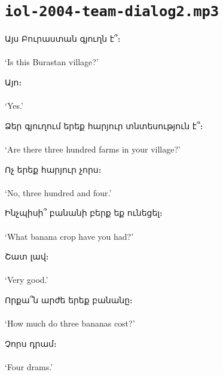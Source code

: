 \documentclass[14pt]{extarticle}
\begin{document}
\section*{\texttt{iol-2004-team-dialog2.mp3}}

\begin{exe}
\ex
\gll Այս Բուրաստան գյուղն է՞։\\
[ɑjs buɾɑstɑn ɡjuʁn ɛ]\\
\glt `Is this Burastan village?'

\ex
\gll Այո։\\
[ɑjɔ]\\
\glt `Yes.'

\ex
\gll Ձեր գյուղում երեք հարյուր տնտեսություն է՞։\\
[d͡zɛɾ ɡjuʁum jɛɾɛkʰ hɑɾjuɾ təntɛsutʰjun ɛ]\\
\glt `Are there three hundred farms in your village?'

\ex
\gll Ոչ երեք հարյուր չորս։\\
[vɔt͡ʃʰ jɛɾɛkʰ hɑɾjuɾ t͡ʃʰɔɾs]\\
\glt `No, three hundred and four.'

\ex
\gll Ինչպիսի՞ բանանի բերք եք ունեցել։\\
[int͡ʃʰpisi bɑnɑni bɛɾkʰ ɛkʰ unɛt͡sʰɛl]\\
\glt `What banana crop have you had?'

\ex
\gll Շատ լավ։\\
[ʃɑt lɑv]\\
\glt `Very good.'

\ex
\gll Որքա՞ն արժե երեք բանանը։\\
[vɔɾkʰɑn ɑɾʒɛ jɛɾɛkʰ bɑnɑnə]\\
\glt `How much do three bananas cost?'

\ex
\gll Չորս դրամ։\\
[t͡ʃʰɔɾs dɾɑm]\\
\glt `Four drams.'
\end{exe}
\end{document}
